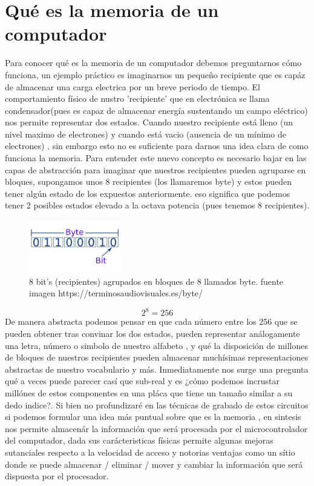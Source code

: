 \documentclass{article}
\begin{document}
\section{Qué es la memoria de un computador}
Para conocer qué es la memoria de un computador debemos preguntarnos  cómo funciona, un ejemplo práctico es imaginarnos un pequeño recipiente que es capáz de almacenar una carga electrica por un breve periodo de tiempo. El comportamiento físico de nustro 'recipiente' que en electrónica se llama condensador(pues es capaz de almacenar energía sustentando un campo eléctrico) nos permite representar dos estados. Cuando nuestro recipiente está lleno (un nivel maximo de electrones) y cuando está vacio (ausencia de un mínimo de electrones) , sin embargo esto no es suficiente para darnos una idea clara de como funciona la memoria.
Para entender este nuevo concepto es necesario bajar en las capas de abstracción para imaginar que nuestros recipientes pueden agruparse en bloques, supongamos unos 8 recipientes (los llamaremos byte) y estos pueden tener algún estado de los expuestos anteriormente. eso significa que podemos tener 2 posibles estados elevado a la octava potencia (pues tenemos 8 recipientes).
\begin{figure}[h]
\includegraphics[width=4cm]{images/byte.png}
\centering
\caption{8 bit's (recipientes)  agrupados en bloques de 8 llamados byte. fuente imagen https://terminosaudiovisuales.es/byte/}
\label{fig:byte}
\end{figure}
\[2^{8}=256 \]
De manera abstracta podemos pensar en que cada número entre los 256 que se pueden obtener tras convinar los dos estados, pueden representar  análogamente una letra, número o simbolo de nuestro alfabeto , y qué la disposición de millones de bloques de nuestros recipientes pueden almacenar muchísimas representaciones abstractas de nuestro vocabulario y más.
Inmediatamente nos surge una pregunta qué a veces puede parecer casí que sub-real y es ¿cómo podemos incrustar millónes de estos componentes en una pláca que tiene un tamaño similar a su dedo indice?. Si bien no profundizaré en las técnicas de grabado de estos circuitos si podemos formular una idea más puntual sobre que es la memoria , en sintesis nos permite almacenár la información que será procesada por el microcontrolador del computador, dada sus carácteristicas físicas permite algunas mejoras sutanciales  respecto a la velocidad de acceso y notorias ventajas como un sítio donde se puede almacenar / eliminar / mover y cambiar la información que será dispuesta por el procesador.
\end{document}
